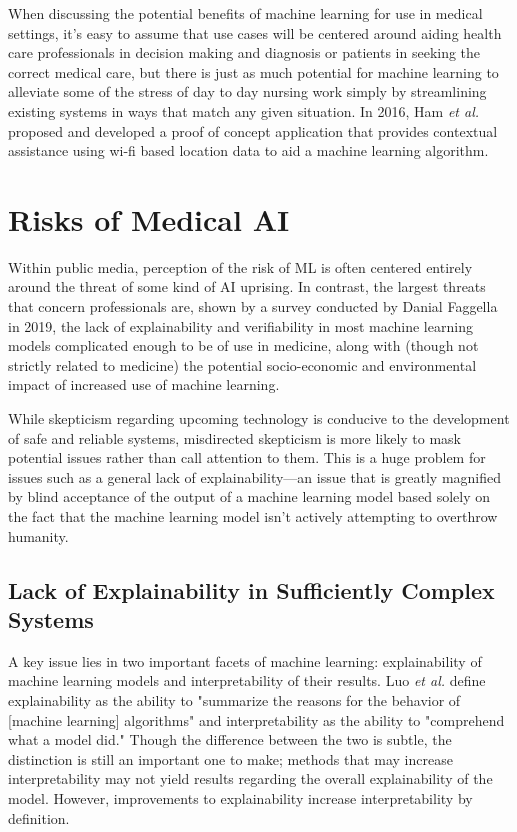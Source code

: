 \documentclass[]{article}
\begin{document}
		When discussing the potential benefits of machine learning for use in medical settings, it's easy to assume that use cases will be centered around aiding health care professionals in decision making and diagnosis or patients in seeking the correct medical care, but there is just as much potential for machine learning to alleviate some of the stress of day to day nursing work simply by streamlining existing systems in ways that match any given situation. In 2016, Ham \emph{et al.} proposed and developed a proof of concept application that provides contextual assistance using wi-fi based location data to aid a machine learning algorithm.\cite{Ham2017}

	\section{Risks of Medical AI}
		Within public media, perception of the risk of ML is often centered entirely around the threat of some kind of AI uprising.\cite{bbc2016rroai} In contrast, the largest threats that concern professionals are, shown by a survey conducted by Danial Faggella in 2019, the lack of explainability and verifiability in most machine learning models complicated enough to be of use in medicine, along with (though not strictly related to medicine) the potential socio-economic and environmental impact of increased use of machine learning.\cite{emerj2019roawrtiwwa}
			
		While skepticism regarding upcoming technology is conducive to the development of safe and reliable systems, misdirected skepticism is more likely to mask potential issues rather than call attention to them. This is a huge problem for issues such as a general lack of explainability---an issue that is greatly magnified by blind acceptance of the output of a machine learning model based solely on the fact that the machine learning model isn't actively attempting to overthrow humanity. 

		\subsection{Lack of Explainability in Sufficiently Complex Systems}
			A key issue lies in two important facets of machine learning: explainability of machine learning models and interpretability of their results. Luo \emph{et al.} define explainability as the ability to "summarize the reasons for the behavior of [machine learning] algorithms" and interpretability as the ability to "comprehend what a model did."\cite{doi:10.1259/bjro.20190021} Though the difference between the two is subtle, the distinction is still an important one to make; methods that may increase interpretability may not yield results regarding the overall explainability of the model. However, improvements to explainability increase interpretability by definition.
\end{document}
